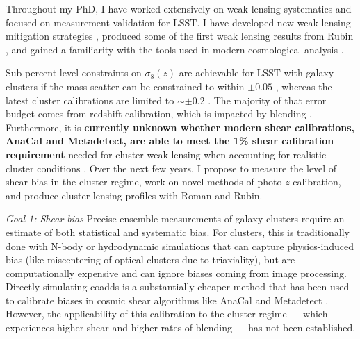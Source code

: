 \documentclass[11pt]{article}
\begin{document}
\indent \indent Throughout my PhD, I have worked extensively on weak lensing systematics and focused on measurement validation for LSST.
I have developed new weak lensing mitigation strategies \cite{unrec_liang, unrec_shear}, produced some of the first weak lensing results from Rubin \cite{a360}, and gained a familiarity with the tools used in modern cosmological analysis \cite{edfs}.

Sub-percent level constraints on $\sigma_8(z)$ are achievable for LSST with galaxy clusters if the mass scatter can be constrained to within $\pm 0.05$ \cite{heidi}, whereas the latest cluster calibrations are limited to $\sim \pm 0.2$ \cite{bocquet, grandis}.
The majority of that error budget comes from redshift calibration, which is impacted by blending \cite{bocquet, grandis, kohlinger}.
Furthermore, it is \textbf{currently unknown whether modern shear calibrations, AnaCal and Metadetect, are able to meet the 1\% shear calibration requirement} needed for cluster weak lensing when accounting for realistic cluster conditions \cite{srd}. 
Over the next few years, I propose to measure the level of shear bias in the cluster regime, work on novel methods of photo-$z$ calibration, and produce cluster lensing profiles with Roman and Rubin.



\textit{Goal 1: Shear bias}
Precise ensemble measurements of galaxy clusters require an estimate of both statistical and systematic bias.
For clusters, this is traditionally done with N-body or hydrodynamic simulations that can capture physics-induced bias (like miscentering of optical clusters due to triaxiality), but are computationally expensive and can ignore biases coming from image processing.
Directly simulating coadds is a substantially cheaper method that has been used to calibrate biases in cosmic shear algorithms like AnaCal and Metadetect \cite{maccrann, sid_desy6, anacal, metadetect}.
However, the applicability of this calibration to the cluster regime --- which experiences higher shear and higher rates of blending --- has not been established.
\end{document}
